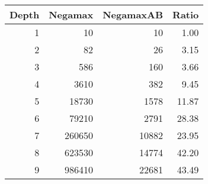 \begin{table}[ht]
\centering
\begin{tabular}{rrrr}
  \hline
Depth & Negamax & NegamaxAB & Ratio \\ 
  \hline
  1 &  10 &  10 & 1.00 \\ 
    2 &  82 &  26 & 3.15 \\ 
    3 & 586 & 160 & 3.66 \\ 
    4 & 3610 & 382 & 9.45 \\ 
    5 & 18730 & 1578 & 11.87 \\ 
    6 & 79210 & 2791 & 28.38 \\ 
    7 & 260650 & 10882 & 23.95 \\ 
    8 & 623530 & 14774 & 42.20 \\ 
    9 & 986410 & 22681 & 43.49 \\ 
   \hline
\end{tabular}
\end{table}
